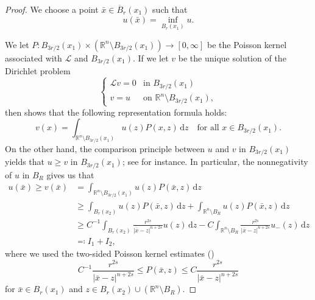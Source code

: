 \documentclass[11pt]{amsart}
\theoremstyle{plain}
\theoremstyle{definition}
\numberwithin{equation}{section}
\begin{document}
\begin{proof} 
 We choose a point $\bar x \in \overline B_r(x_1)$ such that 
\begin{equation*}
    u(\bar x)=\inf_{B_r(x_1)} u.
\end{equation*}

We let $P : B_{3r/2}(x_1) \times (\mathbb{R}^n \setminus B_{3r/2}(x_1)) \to [0, \infty]$ be the Poisson kernel associated with $\mathcal{L}$ and $B_{3r/2}(x_1)$. If we let $v$ be the unique solution of the Dirichlet problem
    \begin{equation*}
        \begin{cases}
            \mathcal{L}v=0 & \text{in $B_{3r/2}(x_1)$}\\
            v=u & \text{on $\mathbb{R}^n \setminus B_{3r/2}(x_1)$},
        \end{cases}
    \end{equation*}
    then  shows that the following representation formula holds:
    \begin{equation*}
        v(x)=\int_{\mathbb{R}^n \setminus B_{3r/2}(x_1)} u(z)P(x, z)\,\mathrm{d}z \quad \text{for all $x \in B_{3r/2}(x_1)$}.
    \end{equation*}
    On the other hand, the comparison principle between $u$ and $v$ in $B_{3r/2}(x_1)$ yields that $u \geq v$ in $B_{3r/2}(x_1)$; see \cite[Lemma~6]{KKP16} for instance. In particular, the nonnegativity of $u$ in $B_R$ gives us that
     \begin{equation*}
        \begin{aligned}
             u(\bar x)\geq v(\bar x)&=\int_{\mathbb{R}^n \setminus B_{3r/2}(x_1)} u(z)P(\bar x, z)\,\mathrm{d}z\\
             &\geq \int_{B_{r}(x_2)} u(z)P(\bar x, z)\,\mathrm{d}z+\int_{\mathbb{R}^n \setminus B_R} u(z)P(\bar x, z)\,\mathrm{d}z\\
             &\geq C^{-1}\int_{B_r(x_2)}  \frac{r^{2s}}{|\bar x-z|^{n+2s}} u(z) \,\mathrm{d}z-C\int_{\mathbb{R}^n \setminus B_R}\frac{r^{2s}}{|\bar x-z|^{n+2s}} u_-(z) \,\mathrm{d}z\\
             &\eqqcolon I_1+I_2,
        \end{aligned}
    \end{equation*}
    where we used the two-sided Poisson kernel estimates ()
    \begin{equation*}
        C^{-1} \frac{r^{2s}}{|\bar x-z|^{n+2s}}\leq P(\bar x, z) \leq C\frac{r^{2s}}{|\bar x-z|^{n+2s}} 
     \end{equation*}
     for $\bar x \in B_r(x_1)$ and $z \in B_r(x_2) \cup (\mathbb{R}^n \setminus B_R)$.
    

\end{proof}
\end{document}
